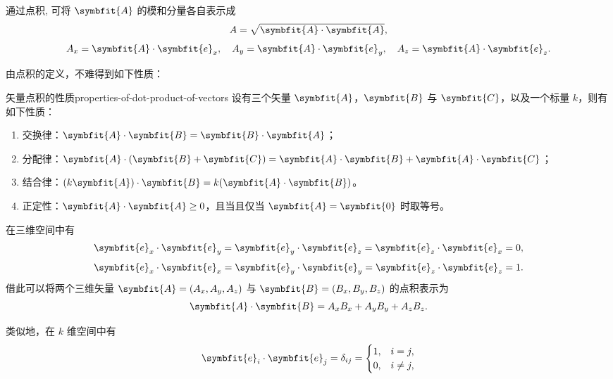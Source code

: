 通过点积, 可将 $ \symbfit{A} $ 的模和分量各自表示成
\begin{equation}
    A = \sqrt{\symbfit{A} \cdot \symbfit{A}} ,
\end{equation}
\begin{equation}
    A_x = \symbfit{A} \cdot \symbfit{e}_x , \quad A_y = \symbfit{A} \cdot \symbfit{e}_y , \quad A_z = \symbfit{A} \cdot \symbfit{e}_z .
\end{equation}

由点积的定义，不难得到如下性质：
\begin{theorem}{矢量点积的性质}{properties-of-dot-product-of-vectors}
    设有三个矢量 $ \symbfit{A} $，$ \symbfit{B} $ 与 $ \symbfit{C} $，以及一个标量 $ k $，则有如下性质：
    \begin{enumerate}
        \item 交换律：$ \symbfit{A} \cdot \symbfit{B} = \symbfit{B} \cdot \symbfit{A} $；
        \item 分配律：$ \symbfit{A} \cdot (\symbfit{B} + \symbfit{C}) = \symbfit{A} \cdot \symbfit{B} + \symbfit{A} \cdot \symbfit{C} $；
        \item 结合律：$ (k \symbfit{A}) \cdot \symbfit{B} = k (\symbfit{A} \cdot \symbfit{B}) $。
        \item 正定性：$ \symbfit{A} \cdot \symbfit{A} \geq 0 $，且当且仅当 $ \symbfit{A} = \symbfit{0} $ 时取等号。
    \end{enumerate}
\end{theorem}

在三维空间中有
\begin{equation}
    \symbfit{e}_x \cdot \symbfit{e}_y = \symbfit{e}_y \cdot \symbfit{e}_z = \symbfit{e}_z \cdot \symbfit{e}_x = 0 ,
\end{equation}
\begin{equation}
    \symbfit{e}_x \cdot \symbfit{e}_x = \symbfit{e}_y \cdot \symbfit{e}_y = \symbfit{e}_z \cdot \symbfit{e}_z = 1 .
\end{equation}
借此可以将两个三维矢量 $ \symbfit{A} = (A_x , A_y , A_z) $ 与 $ \symbfit{B} = (B_x , B_y , B_z) $ 的点积表示为
\begin{equation}
    \symbfit{A} \cdot \symbfit{B} = A_x B_x + A_y B_y + A_z B_z .
\end{equation}

类似地，在 $ k $ 维空间中有
\begin{equation}
    \symbfit{e}_i \cdot \symbfit{e}_j = \delta_{ij} = \begin{cases}
        1 , & i = j ,    \\
        0 , & i \neq j ,
    \end{cases}
\end{equation}

